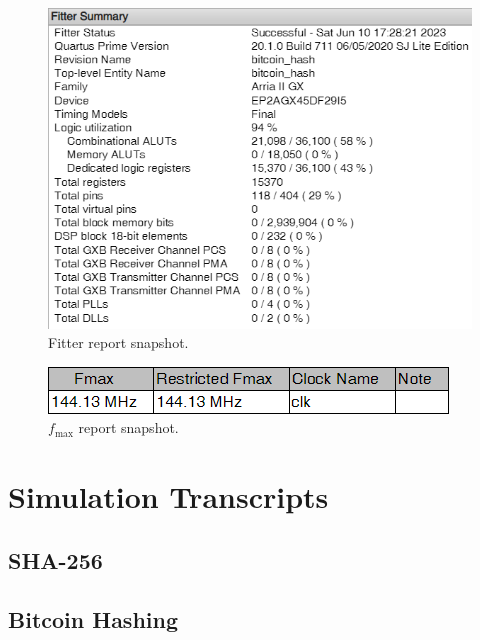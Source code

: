 \documentclass{article}
\begin{document}
\begin{figure}[H]
  \centering
    \centering
    \includegraphics[width=0.7\linewidth]{fitter.png}
  \caption{Fitter report snapshot.}
\end{figure}

\begin{figure}[H]
  \centering
    \centering
    \includegraphics[width=0.6\linewidth]{fmax.png}
  \caption{$f_\text{max}$ report snapshot.}
\end{figure}

\fancyfootoffset{0pt}
\newpage
\section{Simulation Transcripts}

\subsection{SHA-256}



\newpage
\subsection{Bitcoin Hashing}


\newpage


\end{document}
